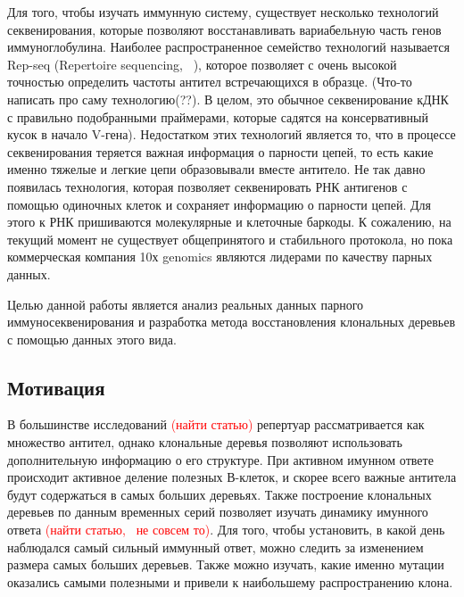 \documentclass{spbau-diploma}
\newcommand{\todo}{\textcolor{red}}
\begin{document}
Для того, чтобы изучать иммунную систему, существует несколько технологий секвенирования, которые позволяют восстанавливать вариабельную часть генов иммуноглобулина.
Наиболее распространенное семейство технологий называется Rep-seq (Repertoire sequencing, ~\cite{pmid22043864}), которое позволяет с очень высокой точностью определить частоты антител встречающихся в образце.
(Что-то написать про саму технологию(??).
В целом, это обычное секвенирование кДНК с правильно подобранными праймерами, которые садятся на консервативный кусок в начало V-гена).
Недостатком этих технологий является то, что в процессе секвенирования теряется важная информация о парности цепей, то есть какие именно тяжелые и легкие цепи образовывали вместе антитело.
Не так давно появилась технология, которая позволяет секвенировать РНК антигенов с помощью одиночных клеток и сохраняет информацию о парности цепей.
Для этого к РНК пришиваются молекулярные и клеточные баркоды.
К сожалению, на текущий момент не существует общепринятого и стабильного протокола, но пока коммерческая компания 10х genomics являются лидерами по качеству парных данных.

Целью данной работы является анализ реальных данных парного иммуносеквенирования и разработка метода восстановления клональных деревьев с помощью данных этого вида.




\subsection{Мотивация}

В большинстве исследований \todo{(найти статью)} репертуар рассматривается как множество антител, однако клональные деревья позволяют использовать дополнительную информацию о его структуре.
При активном имунном ответе происходит активное деление полезных В-клеток, и скорее всего важные антитела будут содержаться в самых больших деревьях.
Также построение клональных деревьев по данным временных серий позволяет изучать динамику имунного ответа \todo{(найти статью,~\cite{stern2014b} не совсем то)}.
Для того, чтобы установить, в какой день наблюдался самый сильный иммунный ответ, можно следить за изменением размера самых больших деревьев.
Также можно изучать, какие именно мутации оказались самыми полезными и привели к наибольшему распространению клона.
\end{document}
